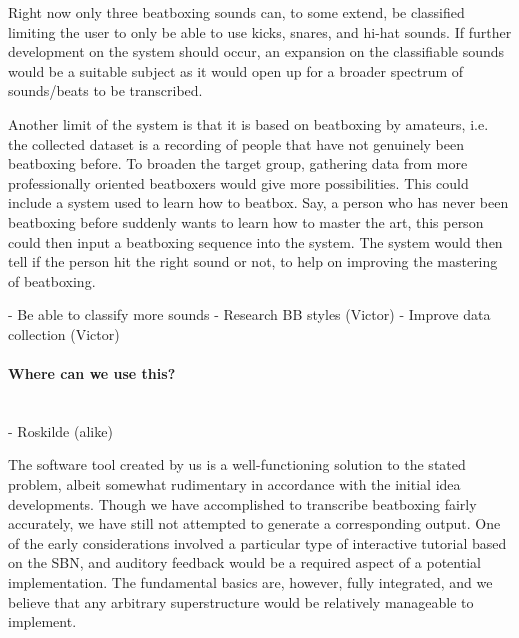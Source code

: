 Right now only three beatboxing sounds can, to some extend, be classified limiting the user to only be able to use kicks, snares, and hi-hat sounds. If further development on the system should occur, an expansion on the classifiable sounds would be a suitable subject as it would open up for a broader spectrum of sounds/beats to be transcribed.

Another limit of the system is that it is based on beatboxing by amateurs, i.e. the collected dataset is a recording of people that have not genuinely been beatboxing before. To broaden the target group, gathering data from more professionally oriented beatboxers would give more possibilities. This could include a system used to learn how to beatbox. Say, a person who has never been beatboxing before suddenly wants to learn how to master the art, this person could then input a beatboxing sequence into the system. The system would then tell if the person hit the right sound or not, to help on improving the mastering of beatboxing.

	- Be able to classify more sounds
		- Research BB styles (Victor)
	- Improve data collection (Victor)


\paragraph{Where can we use this?} \hspace{0pt} \\


	- Roskilde (alike)

The software tool created by us is a well-functioning solution to the stated problem, albeit somewhat rudimentary in accordance with the initial idea developments. Though we have accomplished to transcribe beatboxing fairly accurately, we have still not attempted to generate a corresponding output. One of the early considerations involved a particular type of interactive tutorial based on the SBN, and auditory feedback would be a required aspect of a potential implementation. The fundamental basics are, however, fully integrated, and we believe that any arbitrary superstructure would be relatively manageable to implement.
